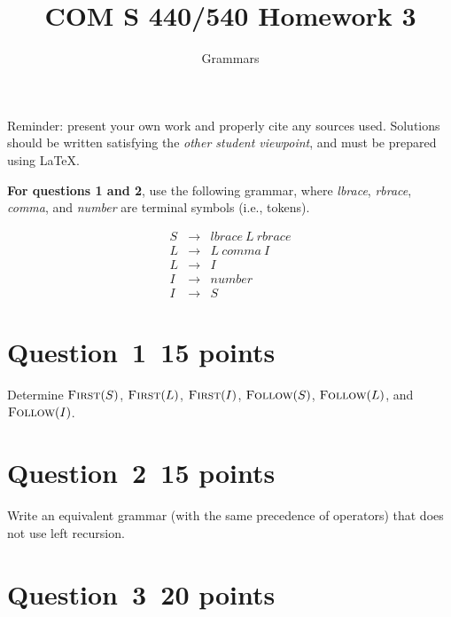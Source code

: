 \documentclass[10pt]{article}
\title{COM S 440/540 Homework 3}
\date{}
\author{Grammars}
\begin{document}
\maketitle

\noindent
Reminder: present your own work and properly cite any sources used.
Solutions should be written satisfying the \emph{other student viewpoint},
and must be prepared using \LaTeX.
\renewcommand{\thepage}{~}
 
\noindent 
{\bf For questions 1 and 2}, use the following grammar, where
\emph{lbrace}, \emph{rbrace}, \emph{comma}, and \emph{number}
are terminal symbols (i.e., tokens).

\begin{eqnarray}
  S & \rightarrow & \mathit{lbrace} ~L~ \mathit{rbrace}
\\
  L & \rightarrow & L ~\mathit{comma}~ I
\\
  L & \rightarrow & I
\\
  I & \rightarrow & \mathit{number}
\\
  I & \rightarrow & S
\end{eqnarray}


\section*{Question~1~\hfill 15 points}

Determine
  $\textsc{First}(S)$,
  $\textsc{First}(L)$,
  $\textsc{First}(I)$,
  $\textsc{Follow}(S)$,
  $\textsc{Follow}(L)$, and
  $\textsc{Follow}(I)$.


\section*{Question~2~\hfill 15 points}

Write an equivalent grammar (with the same precedence
of operators) that does not use left recursion.


\section*{Question~3~\hfill 20 points}
\end{document}
